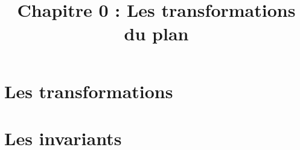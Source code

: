 \title{\vspace{-3em}Chapitre 0 : Les transformations du plan\vspace{-4em}}%
\date{ }
\maketitle


\section{Les transformations}



\section{Les invariants}


